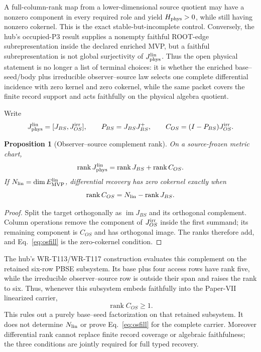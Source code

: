 \documentclass[11pt]{article}
\newtheorem{proposition}{Proposition}
\begin{document}
A full-column-rank map from a lower-dimensional source quotient may have a
nonzero component in every required role and yield $H_{\rm phys}>0$, while
still having nonzero cokernel.  This is the exact stable-but-incomplete
control.  Conversely, the hub's occupied-P3 result supplies a nonempty
faithful ROOT-edge subrepresentation inside the declared enriched MVP, but a
faithful subrepresentation is not global surjectivity of
$J_{\rm phys}^{\rm lin}$.
Thus the open physical statement is no longer a list of terminal choices: it
is whether the enriched base--seed/body plus irreducible observer--source law
selects one complete differential incidence with zero kernel and zero
cokernel, while the same packet covers the finite record support and acts
faithfully on the physical algebra quotient.

Write
\begin{equation}
J_{\rm phys}^{\rm lin}=[J_{BS},J_{OS}^{\rm irr}],
\qquad
P_{BS}=J_{BS}J_{BS}^{+},
\qquad
C_{OS}=(I-P_{BS})J_{OS}^{\rm irr}.
\label{eq:oscomplement}
\end{equation}

\begin{proposition}[Observer--source complement rank]
\label{prop:oscomplement}
On a source-frozen metric chart,
\begin{equation}
\operatorname{rank}J_{\rm phys}^{\rm lin}
=\operatorname{rank}J_{BS}+\operatorname{rank}C_{OS}.
\label{eq:osrank}
\end{equation}
If $N_{\rm lin}=\dim E_{\rm MVP}^{\rm lin}$, differential recovery has zero
cokernel exactly when
\begin{equation}
\operatorname{rank}C_{OS}
=N_{\rm lin}-\operatorname{rank}J_{BS}.
\label{eq:osfill}
\end{equation}
\end{proposition}

\begin{proof}
Split the target orthogonally as $\operatorname{im}J_{BS}$ and its
orthogonal complement. Column operations remove the component of
$J_{OS}^{\rm irr}$ inside the first summand; its remaining component is
$C_{OS}$ and has orthogonal image. The ranks therefore add, and
Eq.~\eqref{eq:osfill} is the zero-cokernel condition.
\end{proof}

The hub's WR-T113/WR-T117 construction evaluates this complement on the
retained six-row PBSE subsystem.  Its base plus four access rows have rank
five, while the irreducible observer--source row is outside their span and
raises the rank to six.  Thus, whenever this subsystem embeds faithfully into
the Paper-VII linearized carrier,
\begin{equation}
\operatorname{rank}C_{OS}\ge1.
\label{eq:pbselowerbound}
\end{equation}
This rules out a purely base--seed factorization on that retained subsystem.
It does not determine $N_{\rm lin}$ or prove Eq.~\eqref{eq:osfill} for the
complete carrier.  Moreover differential rank cannot replace finite record
coverage or algebraic faithfulness; the three conditions are jointly required
for full typed recovery.
\end{document}
